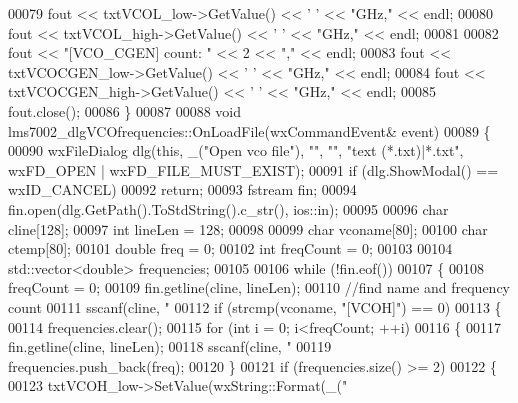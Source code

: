 \begin{DoxyCode}
{{{{{{{{00079     fout << txtVCOL_low->GetValue() << \textcolor{charliteral}{' '} << \textcolor{stringliteral}{"GHz,"} << endl;
00080     fout << txtVCOL_high->GetValue() << \textcolor{charliteral}{' '} << \textcolor{stringliteral}{"GHz,"} << endl;
00081 
00082     fout << \textcolor{stringliteral}{"[VCO\_CGEN] count: "} << 2 << \textcolor{stringliteral}{","} << endl;
00083     fout << txtVCOCGEN_low->GetValue() << \textcolor{charliteral}{' '} << \textcolor{stringliteral}{"GHz,"} << endl;
00084     fout << txtVCOCGEN_high->GetValue() << \textcolor{charliteral}{' '} << \textcolor{stringliteral}{"GHz,"} << endl;
00085     fout.close();
00086 \}
00087 
00088 \textcolor{keywordtype}{void} lms7002_dlgVCOfrequencies::OnLoadFile(wxCommandEvent& event)
00089 \{
00090     wxFileDialog dlg(\textcolor{keyword}{this}, \_(\textcolor{stringliteral}{"Open vco file"}), \textcolor{stringliteral}{""}, \textcolor{stringliteral}{""}, \textcolor{stringliteral}{"text (*.txt)|*.txt"}, wxFD\_OPEN | 
      wxFD\_FILE\_MUST\_EXIST);
00091     \textcolor{keywordflow}{if} (dlg.ShowModal() == wxID\_CANCEL)
00092         \textcolor{keywordflow}{return};
00093     fstream fin;
00094     fin.open(dlg.GetPath().ToStdString().c\_str(), ios::in);
00095 
00096     \textcolor{keywordtype}{char} cline[128];
00097     \textcolor{keywordtype}{int} lineLen = 128;
00098 
00099     \textcolor{keywordtype}{char} vconame[80];
00100     \textcolor{keywordtype}{char} ctemp[80];
00101     \textcolor{keywordtype}{double} freq = 0;
00102     \textcolor{keywordtype}{int} freqCount = 0;
00103 
00104     std::vector<double> frequencies;
00105 
00106     \textcolor{keywordflow}{while} (!fin.eof())
00107     \{
00108         freqCount = 0;
00109         fin.getline(cline, lineLen);
00110         \textcolor{comment}{//find name and frequency count}
00111         sscanf(cline, \textcolor{stringliteral}{"%
00112         \textcolor{keywordflow}{if} (strcmp(vconame, \textcolor{stringliteral}{"[VCOH]"}) == 0)
00113         \{
00114             frequencies.clear();
00115             \textcolor{keywordflow}{for} (\textcolor{keywordtype}{int} i = 0; i<freqCount; ++i)
00116             \{
00117                 fin.getline(cline, lineLen);
00118                 sscanf(cline, \textcolor{stringliteral}{"%
00119                 frequencies.push\_back(freq);
00120             \}
00121             \textcolor{keywordflow}{if} (frequencies.size() >= 2)
00122             \{
00123                 txtVCOH_low->SetValue(wxString::Format(\_(\textcolor{stringliteral}{"%
}}}}}}}}}}}
\end{DoxyCode}
